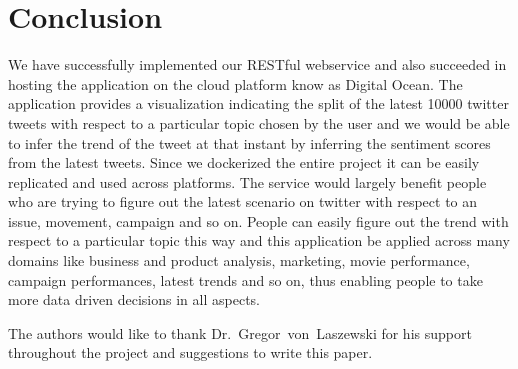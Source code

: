 \section{Conclusion}
We have successfully implemented our RESTful webservice and also succeeded in 
hosting the application on the cloud platform know as Digital Ocean. The 
application provides a visualization indicating the split of the latest 10000 
twitter tweets with respect to a particular topic chosen by the user and we 
would be able to infer the trend of the tweet at that instant by inferring the 
sentiment scores from the latest tweets. Since we dockerized the entire project 
it can be easily replicated and used across platforms. The service would 
largely benefit people who are trying to figure out the latest scenario on 
twitter with respect to an issue, movement, campaign and so on. People can 
easily figure out the trend with respect to a particular topic this way and 
this application be applied across many domains like business and product 
analysis, marketing, movie performance, campaign performances, latest trends 
and so on, thus enabling people to take more data driven decisions in all 
aspects.


\begin{acks}

	The authors would like to thank Dr.~Gregor~von~Laszewski for his
	support throughout the project and suggestions to write this paper.

\end{acks}



 
